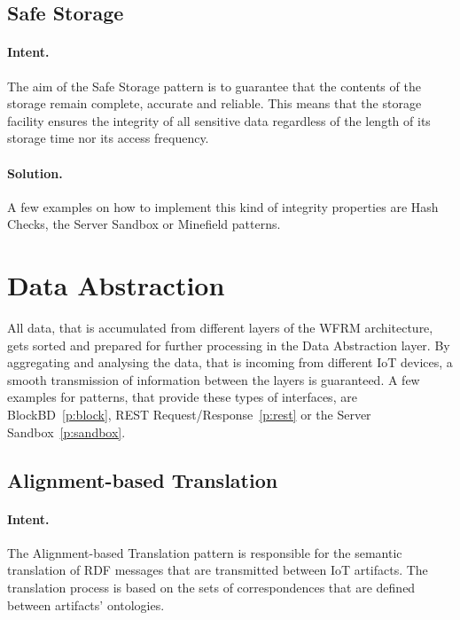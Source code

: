\subsection{Safe Storage~\cite{Papoutsakis2021}} 
\label{p:ss}

\paragraph{\textbf{Intent.}} The aim of the Safe Storage pattern is to guarantee that the contents of the storage remain complete, accurate and reliable. This means that the storage facility ensures the integrity of all sensitive data regardless of the length of its storage time nor its access frequency.

\paragraph{\textbf{Solution.}} A few examples on how to implement this kind of integrity properties are Hash Checks, the Server Sandbox or Minefield patterns.



\section{Data Abstraction}\label{L5} 
All data, that is accumulated from different layers of the WFRM architecture, gets sorted and prepared for further processing in the Data Abstraction layer. By aggregating and analysing the data, that is incoming from different IoT devices, a smooth transmission of information between the layers is guaranteed. A few examples for patterns, that provide these types of interfaces, are BlockBD~\ref{p:block}, REST Request/Response~\ref{p:rest} or the Server Sandbox~\ref{p:sandbox}.


\subsection{Alignment-based Translation~\cite{Tkaczyk2018}}
\label{p:translation} 

\paragraph{\textbf{Intent.}} The Alignment-based Translation pattern is responsible for the semantic translation of RDF messages that are transmitted between IoT artifacts. The translation process is based on the sets of correspondences that are defined between artifacts' ontologies.

